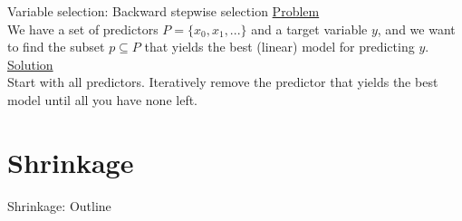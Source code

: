 \documentclass[8pt]{beamer}
\begin{document}
    \begin{frame}[t]{Variable selection: Backward stepwise selection}
        \underline{Problem}\\
        We have a set of predictors $P=\{x_0, x_1, ...\}$ and a target variable $y$, and we want to find the subset $p \subseteq P$ that yields the best (linear) model for predicting $y$.\\
        \vspace{0.25cm}
        \underline{Solution}\\
        Start with all predictors. Iteratively remove the predictor that yields the best model until all you have none left.\\
    \end{frame}

    \section{Shrinkage}

    \def\codewidth{5.2cm}

    \begin{frame}[fragile]{Shrinkage: Outline} %
        \centering
        \vfill
        \\
        \vfill
    \end{frame}
\end{document}
